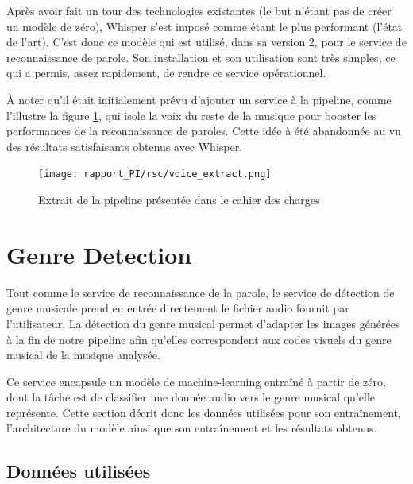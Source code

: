 Après avoir fait un tour des technologies existantes (le but n'étant pas de créer un modèle de zéro), Whisper \cite{openai_whisper} s'est imposé comme étant le plus performant (l'état de l'art). C'est donc ce modèle qui est utilisé, dans sa version 2, pour le service de reconnaissance de parole. Son installation et son utilisation sont très simples, ce qui a permis, assez rapidement, de rendre ce service opérationnel.

À noter qu'il était initialement prévu d'ajouter un service à la pipeline, comme l'illustre la figure \ref{fig:voice_extraction}, qui isole la voix du reste de la musique pour booster les performances de la reconnaissance de paroles. Cette idée à été abandonnée au vu des résultats satisfaisants obtenus avec Whisper.

\begin{figure}[H]
    \begin{center}
        \texttt{[image: rapport\_PI/rsc/voice\_extract.png]}
        \caption{Extrait de la pipeline présentée dans le cahier des charges \cite{CDC}}
        \label{fig:voice_extraction}
    \end{center}
\end{figure}

\section{Genre Detection}\label{sec:genre_detection}

Tout comme le service de reconnaissance de la parole, le service de détection de genre musicale prend en entrée directement le fichier audio fournit par l'utilisateur. La détection du genre musical permet d'adapter les images générées à la fin de notre pipeline afin qu'elles correspondent aux codes visuels du genre musical de la musique analysée.

Ce service encapsule un modèle de machine-learning entraîné à partir de zéro, dont la tâche est de classifier une donnée audio vers le genre musical qu'elle représente. Cette section décrit donc les données utilisées pour son entraînement, l'architecture du modèle ainsi que son entraînement et les résultats obtenus.

\subsection{Données utilisées}

